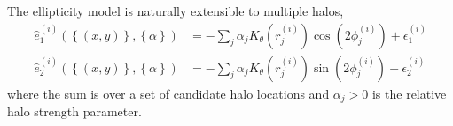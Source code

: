 \documentclass{article}
\renewcommand{\i}{^{(i)}}
\begin{document}
The ellipticity model is naturally extensible to multiple halos,
\begin{align*}
\hat{e}_1\i(\left\{(x,y)\right\},\left\{\alpha\right\}) & = -\sum_{j} \alpha_j K_{\theta}(r\i_j) \cos(2\phi\i_j) + \epsilon_1\i \\
\hat{e}_2\i(\left\{(x,y)\right\},\left\{\alpha\right\}) & = -\sum_{j} \alpha_j K_{\theta}(r\i_j) \sin(2\phi\i_j) + \epsilon_2\i 
\end{align*}
where the sum is over a set of candidate halo locations and $\alpha_j > 0$ is the relative halo strength parameter.
\end{document}

